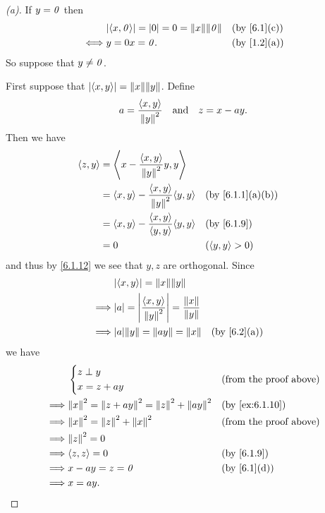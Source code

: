 \begin{proof}[(a)]
  If \(y = \mathit{0}\) then
  \begin{align*}
         & \abs{\inn{x, \zv}} = \abs{0} = 0 = \norm{x} \norm{\zv} &  & \by{6.1}[c] \\
    \iff & y = 0x = \zv.                                          &  & \by{1.2}[a]
  \end{align*}
  So suppose that \(y \neq \mathit{0}\).

  First suppose that \(\abs{\inn{x, y}} = \norm{x} \norm{y}\).
  Define
  \[
    a = \dfrac{\left\langle x, y\right\rangle}{\left\lVert y\right\rVert^2} \quad \text{and} \quad z = x - ay.
  \]
  Then we have
  \begin{align*}
    \inn{z, y} & = \inn{x - \dfrac{\inn{x, y}}{\norm{y}^2} y, y}                                \\
               & = \inn{x, y} - \dfrac{\inn{x, y}}{\norm{y}^2} \inn{y, y} &  & \by{6.1.1}[a,b]  \\
               & = \inn{x, y} - \dfrac{\inn{x, y}}{\inn{y, y}} \inn{y, y} &  & \by{6.1.9}       \\
               & = 0                                                      &  & (\inn{y, y} > 0)
  \end{align*}
  and thus by \cref{6.1.12} we see that \(y, z\) are orthogonal.
  Since
  \begin{align*}
             & \abs{\inn{x, y}} = \norm{x} \norm{y}                                                         \\
    \implies & \abs{a} = \abs{\dfrac{\inn{x, y}}{\norm{y}^2}} = \dfrac{\norm{x}}{\norm{y}}                  \\
    \implies & \abs{a} \norm{y} = \norm{ay} = \norm{x}                                     &  & \by{6.2}[a] \\
  \end{align*}
  we have
  \begin{align*}
             & \begin{dcases}
                 z \perp y \\
                 x = z + ay
               \end{dcases}                                          &  & \text{(from the proof above)}   \\
    \implies & \norm{x}^2 = \norm{z + ay}^2 = \norm{z}^2 + \norm{ay}^2 &  & \by{ex:6.1.10}                \\
    \implies & \norm{x}^2 = \norm{z}^2 + \norm{x}^2                    &  & \text{(from the proof above)} \\
    \implies & \norm{z}^2 = 0                                                                             \\
    \implies & \inn{z, z} = 0                                          &  & \by{6.1.9}                    \\
    \implies & x - ay = z = \zv                                        &  & \by{6.1}[d]                   \\
    \implies & x = ay.
  \end{align*}


\end{proof}
